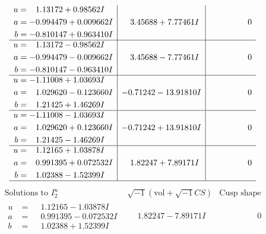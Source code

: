 \documentclass[1p]{elsarticle_modified}
\theoremstyle{definition}
\newcommand{\I}{\sqrt{-1}}
\begin{document}
$$\begin{array}{c|c|c}
\begin{aligned}
u &= \phantom{-}1.13172 + 0.98562 I \\
a &= -0.994479 + 0.009662 I \\
b &= -0.810147 + 0.963410 I\end{aligned}
 & \phantom{-}3.45688 + 7.77461 I & \phantom{-0.000000 } 0 \\ \hline\begin{aligned}
u &= \phantom{-}1.13172 - 0.98562 I \\
a &= -0.994479 - 0.009662 I \\
b &= -0.810147 - 0.963410 I\end{aligned}
 & \phantom{-}3.45688 - 7.77461 I & \phantom{-0.000000 } 0 \\ \hline\begin{aligned}
u &= -1.11008 + 1.03693 I \\
a &= \phantom{-}1.029620 - 0.123660 I \\
b &= \phantom{-}1.21425 + 1.46269 I\end{aligned}
 & -0.71242 - 13.91810 I & \phantom{-0.000000 } 0 \\ \hline\begin{aligned}
u &= -1.11008 - 1.03693 I \\
a &= \phantom{-}1.029620 + 0.123660 I \\
b &= \phantom{-}1.21425 - 1.46269 I\end{aligned}
 & -0.71242 + 13.91810 I & \phantom{-0.000000 } 0 \\ \hline\begin{aligned}
u &= \phantom{-}1.12165 + 1.03878 I \\
a &= \phantom{-}0.991395 + 0.072532 I \\
b &= \phantom{-}1.02388 - 1.52399 I\end{aligned}
 & \phantom{-}1.82247 + 7.89171 I & \phantom{-0.000000 } 0\\
 \hline 
 \end{array}$$\newpage$$\begin{array}{c|c|c}  
\text{Solutions to }I^u_{2}& \I (\text{vol} + \sqrt{-1}CS) & \text{Cusp shape}\\
 \hline 
\begin{aligned}
u &= \phantom{-}1.12165 - 1.03878 I \\
a &= \phantom{-}0.991395 - 0.072532 I \\
b &= \phantom{-}1.02388 + 1.52399 I\end{aligned}
 & \phantom{-}1.82247 - 7.89171 I & \phantom{-0.000000 } 0 \\ \hline\begin{aligned}

\end{aligned}
\end{array}$$
\end{document}
